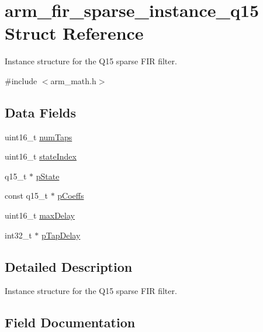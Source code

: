 \hypertarget{structarm__fir__sparse__instance__q15}{}\section{arm\+\_\+fir\+\_\+sparse\+\_\+instance\+\_\+q15 Struct Reference}
\label{structarm__fir__sparse__instance__q15}


Instance structure for the Q15 sparse F\+IR filter.  




{\ttfamily \#include $<$arm\+\_\+math.\+h$>$}

\subsection*{Data Fields}
\begin{DoxyCompactItemize}
\item 
uint16\+\_\+t \mbox{\hyperlink{structarm__fir__sparse__instance__q15_a751941891e47f522a7f5375fe8990aac}{num\+Taps}}
\item 
uint16\+\_\+t \mbox{\hyperlink{structarm__fir__sparse__instance__q15_a566a0cb53437e48b9a3bf18e5b03d8aa}{state\+Index}}
\item 
q15\+\_\+t $\ast$ \mbox{\hyperlink{structarm__fir__sparse__instance__q15_ae29dfdb736374fcddaeaec4b7770170c}{p\+State}}
\item 
const q15\+\_\+t $\ast$ \mbox{\hyperlink{structarm__fir__sparse__instance__q15_ae85d417edcdce57e9a54f8c841580578}{p\+Coeffs}}
\item 
uint16\+\_\+t \mbox{\hyperlink{structarm__fir__sparse__instance__q15_ab25f4ee7550e6d92acff77ada283733f}{max\+Delay}}
\item 
int32\+\_\+t $\ast$ \mbox{\hyperlink{structarm__fir__sparse__instance__q15_adec00b3793ab4f08edfeb4ea6a9eb6e6}{p\+Tap\+Delay}}
\end{DoxyCompactItemize}


\subsection{Detailed Description}
Instance structure for the Q15 sparse F\+IR filter. 

\subsection{Field Documentation}
\mbox{\label{structarm__fir__sparse__instance__q15_ab25f4ee7550e6d92acff77ada283733f}} 
